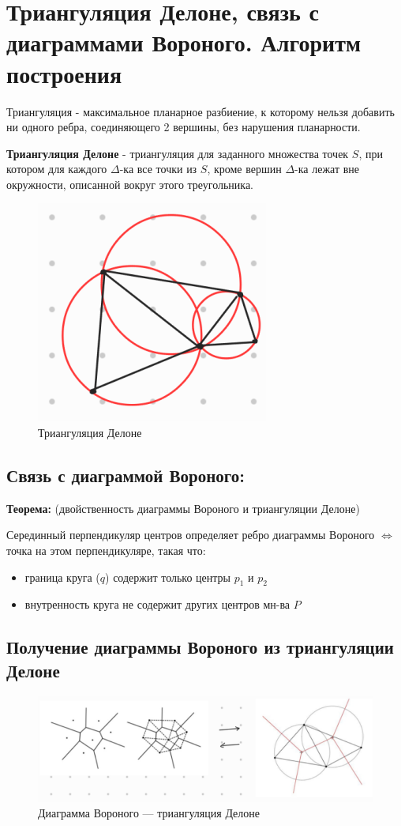 \section{Триангуляция Делоне, связь с диаграммами Вороного. Алгоритм построения }

Триангуляция - максимальное планарное разбиение, к которому нельзя добавить ни одного ребра, соединяющего 2 вершины, без нарушения планарности. 

\textbf{Триангуляция Делоне} - триангуляция для заданного множества точек $S$, при котором для каждого $\Delta$-ка все точки из $S$, кроме вершин $\Delta$-ка лежат вне окружности, описанной вокруг этого треугольника. 
\begin{figure}[h!]
	\centering
	\includegraphics[width=0.4\linewidth]{img/14_1.png}
	\captionsetup{labelformat=empty}
	\caption{Триангуляция Делоне}
\end{figure}


\subsection*{Связь с диаграммой Вороного: }
\textbf{Теорема:} (двойственность диаграммы Вороного и триангуляции Делоне) 

Серединный перпендикуляр центров определяет ребро диаграммы Вороного $\Leftrightarrow$ точка на этом перпендикуляре, такая что: 
\begin{itemize}
	\item граница круга ($q$) содержит только центры $p_1$ и $p_2$ 
	\item внутренность круга не содержит других центров мн-ва $P$ 
\end{itemize}

\subsection*{Получение диаграммы Вороного из триангуляции Делоне }
\begin{figure}[h!]
	\centering
	\includegraphics[width=0.5\linewidth]{img/14_2.png}
	\captionsetup{labelformat=empty}
	\caption{Диаграмма Вороного --- триангуляция Делоне}
\end{figure}


